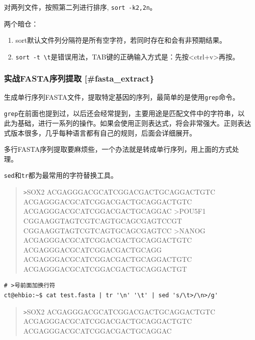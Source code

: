\documentclass[]{article}
\providecommand{\tightlist}{%
  \setlength{\itemsep}{0pt}\setlength{\parskip}{0pt}}
\numberwithin{figure}{section}
\numberwithin{table}{section}
\begin{document}
对两列文件，按照第二列进行排序, \texttt{sort\ -k2,2n}。

两个暗仓：

\begin{enumerate}
\def\labelenumi{\arabic{enumi}.}
\tightlist
\item
  sort默认文件列分隔符是所有空字符，若同时存在和会有非预期结果。
\item
  \texttt{sort\ -t\ \textquotesingle{}\textbackslash{}t\textquotesingle{}}是错误用法，TAB键的正确输入方式是：先按\textless ctrl+v\textgreater 再按。
\end{enumerate}

\hypertarget{ux5b9eux6218fastaux5e8fux5217ux63d0ux53d6-fasta_extract}{%
\subsubsection{实战FASTA序列提取 {[}\#fasta\_extract\}}\label{ux5b9eux6218fastaux5e8fux5217ux63d0ux53d6-fasta_extract}}

生成单行序列FASTA文件，提取特定基因的序列，最简单的是使用\texttt{grep}命令。

\texttt{grep}在前面也提到过，以后还会经常提到，主要用途是匹配文件中的字符串，以此为基础，进行一系列的操作。如果会使用正则表达式，将会非常强大。正则表达式版本很多，几乎每种语言都有自己的规则，后面会详细展开。

多行FASTA序列提取要麻烦些，一个办法就是转成单行序列，用上面的方式处理。

\texttt{sed}和\texttt{tr}都为最常用的字符替换工具。

\begin{quote}
\texttt{\textgreater{}}SOX2 ACGAGGGACGCATCGGACGACTGCAGGACTGTC ACGAGGGACGCATCGGACGACTGCAGGACTGTC ACGAGGGACGCATCGGACGACTGCAGGAC \textgreater POU5F1 CGGAAGGTAGTCGTCAGTGCAGCGAGTCCGT CGGAAGGTAGTCGTCAGTGCAGCGAGTCC \textgreater NANOG ACGAGGGACGCATCGGACGACTGCAGGACTGTC ACGAGGGACGCATCGGACGACTGCAGG ACGAGGGACGCATCGGACGACTGCAGGACTGTC ACGAGGGACGCATCGGACGACTGCAGGACTGT
\end{quote}

\begin{verbatim}
# >号前面加换行符
ct@ehbio:~$ cat test.fasta | tr '\n' '\t' | sed 's/\t>/\n>/g'
\end{verbatim}

\begin{quote}
\texttt{\textgreater{}}SOX2 ACGAGGGACGCATCGGACGACTGCAGGACTGTC ACGAGGGACGCATCGGACGACTGCAGGACTGTC ACGAGGGACGCATCGGACGACTGCAGGAC
\end{quote}
\end{document}
